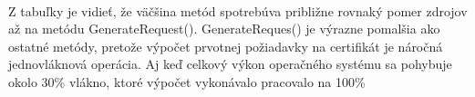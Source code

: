 \documentclass[
  digital, %
  table,   %
oneside,
  nolof,     %
  nolot,     %
]{fithesis3}
\begin{document}
\begin{table}[htbp]
	\begin{center}
	\end{center}
	\caption{Ukážka nameraných hodnôt}
	\label{table:1000}
\end{table}

\paragraph{}
Z tabuľky je vidieť, že väčšina metód spotrebúva približne rovnaký pomer zdrojov až na metódu GenerateRequest().  GenerateReques() je výrazne pomalšia ako ostatné metódy, pretože výpočet prvotnej požiadavky na certifikát je náročná jednovláknová operácia. Aj keď celkový výkon operačného systému sa pohybuje okolo 30\% vlákno, ktoré výpočet vykonávalo pracovalo na 100\% 
\end{document}
